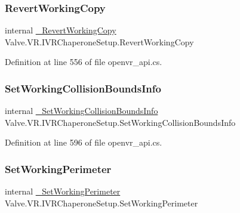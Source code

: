 \subsubsection{\texorpdfstring{RevertWorkingCopy}{RevertWorkingCopy}}
{\footnotesize\ttfamily internal \mbox{\hyperlink{struct_valve_1_1_v_r_1_1_i_v_r_chaperone_setup_a236b48bec2b3c4a19ff1ea4853cc42a2}{\+\_\+\+Revert\+Working\+Copy}} Valve.\+V\+R.\+I\+V\+R\+Chaperone\+Setup.\+Revert\+Working\+Copy}



Definition at line 556 of file openvr\+\_\+api.\+cs.

\mbox{\label{struct_valve_1_1_v_r_1_1_i_v_r_chaperone_setup_aa1deb1f74bcff51bfa63537978e51ff0}} 
\subsubsection{\texorpdfstring{SetWorkingCollisionBoundsInfo}{SetWorkingCollisionBoundsInfo}}
{\footnotesize\ttfamily internal \mbox{\hyperlink{struct_valve_1_1_v_r_1_1_i_v_r_chaperone_setup_a1826d10332305d4c90afaf2949c8b5ce}{\+\_\+\+Set\+Working\+Collision\+Bounds\+Info}} Valve.\+V\+R.\+I\+V\+R\+Chaperone\+Setup.\+Set\+Working\+Collision\+Bounds\+Info}



Definition at line 596 of file openvr\+\_\+api.\+cs.

\mbox{\label{struct_valve_1_1_v_r_1_1_i_v_r_chaperone_setup_a5d94d0c27aed104f0fda458684e01da5}} 
\subsubsection{\texorpdfstring{SetWorkingPerimeter}{SetWorkingPerimeter}}
{\footnotesize\ttfamily internal \mbox{\hyperlink{struct_valve_1_1_v_r_1_1_i_v_r_chaperone_setup_ad35ac33bfa800e014d9b1a6bac63e1db}{\+\_\+\+Set\+Working\+Perimeter}} Valve.\+V\+R.\+I\+V\+R\+Chaperone\+Setup.\+Set\+Working\+Perimeter}



